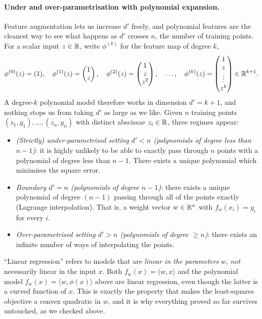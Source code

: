 \paragraph{Under and over-parametrisation with polynomial expansion.}
Feature augmentation lets us increase $d'$ freely, and polynomial features are
the cleanest way to see what happens as $d'$ crosses $n$, the number of
training points. For a scalar input $z \in \mathbb{R}$, write $\phi^{(k)}$ for the
feature map of degree $k$,
\[
\phi^{(0)}(z) = (1), \quad
\phi^{(1)}(z) = \begin{pmatrix} 1 \\ z \end{pmatrix}, \quad
\phi^{(2)}(z) = \begin{pmatrix} 1 \\ z \\ z^2 \end{pmatrix}, \quad \dots, \quad
\phi^{(k)}(z) = \begin{pmatrix} 1 \\ z \\ \vdots \\ z^k \end{pmatrix} \in \mathbb{R}^{k+1} .
\]
A degree-$k$ polynomial model therefore works in
dimension $d' = k+1$, and nothing stops us from taking $d'$ as large as we like. Given $n$
training points $(z_1, y_1), \dots, (z_n, y_n)$ with distinct abscissae $z_i \in \mathbb{R}$, three regimes appear:
\begin{itemize}
    \item \emph{(Strictly) under-parametrised setting $d' < n$ (polynomials of degree less than $n - 1$)}: it is highly unlikely to be able to exactly pass through $n$ points with a polynomial of degree less than $n - 1$. There exists a unique polynomial which minimises the square error.
    \item \emph{Boundary $d' = n$ (polynomials of degree $n - 1$)}: there exists a unique polynomial of degree $(n-1)$ passing through all of the points exactly (Lagrange interpolation). That is, a weight vector $w \in \mathbb{R}^n$ with $f_w(x_i) = y_i$ for every $i$.
    \item \emph{Over-parametrised setting $d' > n$ (polynomials of degree $\geq n$)}: there exists an infinite number of ways of interpolating the points.
\end{itemize}

\begin{remark}
``Linear regression'' refers to models that are \emph{linear in the parameters}
$w$, \emph{not} necessarily linear in the input $x$. Both $f_w(x) = \langle
w, x\rangle$ and the polynomial model $f_w(x) = \langle w, \phi(x)\rangle$ above
are linear regression, even though the latter is a curved function of $x$. This
is exactly the property that makes the least-squares objective a convex
quadratic in $w$, and it is why everything proved so far survives untouched, as
we checked above.
\end{remark}

